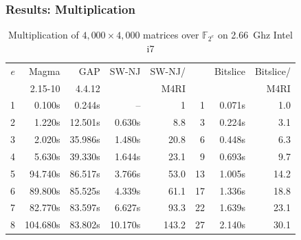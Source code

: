 \documentclass[11pt]{beamer}
\newcommand{\field}[1]{\mathbb{#1}}
\newcommand{\F}{\ensuremath{\field{F}}\xspace}
\newcommand{\mycomputer}{2.66~Ghz Intel i7\xspace}
\begin{document}
\begin{frame}[allowframebreaks]
\frametitle{Results: Multiplication}

\begin{table}[ht]
\begin{scriptsize}
\begin{center}
\begin{tabular}{|r||r|r||r|r|r||r|r|}
\hline
 $e$ & Magma & GAP & SW-NJ & SW-NJ/ & \cite{M05} & Bitslice & Bitslice/\\
     & {\footnotesize 2.15-10} & {\footnotesize 4.4.12} & & M4RI & &  & M4RI\\
\hline
 1 &   0.100s &  0.244s &      -- &     1 &  1 & 0.071s &  1.0\\
 2 &   1.220s & 12.501s &  0.630s &   8.8 &  3 & 0.224s &  3.1\\
 3 &   2.020s & 35.986s &  1.480s &  20.8 &  6 & 0.448s &  6.3\\
 4 &   5.630s & 39.330s &  1.644s &  23.1 &  9 & 0.693s &  9.7\\
 5 &  94.740s & 86.517s &  3.766s &  53.0 & 13 & 1.005s & 14.2\\
 6 &  89.800s & 85.525s &  4.339s &  61.1 & 17 & 1.336s & 18.8\\
 7 &  82.770s & 83.597s &  6.627s &  93.3 & 22 & 1.639s & 23.1\\
 8 & 104.680s & 83.802s & 10.170s & 143.2 & 27 & 2.140s & 30.1\\
\hline
\end{tabular}
\caption{Multiplication of $4,000 \times 4,000$ matrices over $\F_{2^e}$ on \mycomputer}
\label{tab:karatsuba_mat_mul_times}
\end{center}
\end{scriptsize}
\end{table}
\framebreak 


\end{frame}
\end{document}

